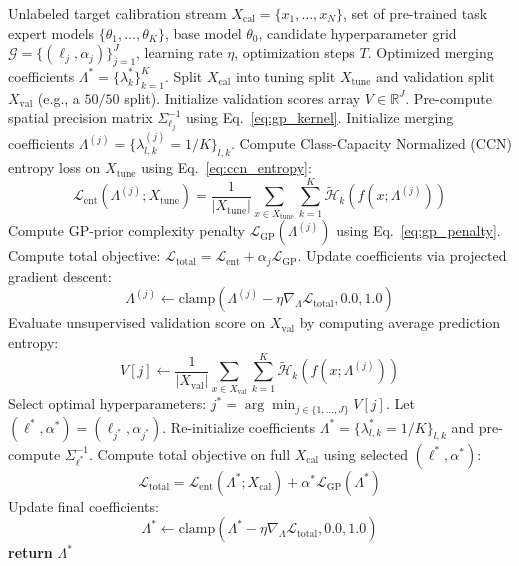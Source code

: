 \documentclass{article}
\theoremstyle{plain}
\theoremstyle{definition}
\theoremstyle{remark}
\begin{document}
\begin{algorithm}[tb]
\caption{Calibration Cross-Validation (CCV) for GP-BayesMerge}
\label{alg:ccv}
\begin{algorithmic}[1]
\REQUIRE Unlabeled target calibration stream $X_{\text{cal}} = \{x_1, \dots, x_N\}$, set of pre-trained task expert models $\{\theta_1, \dots, \theta_K\}$, base model $\theta_0$, candidate hyperparameter grid $\mathcal{G} = \{(\ell_j, \alpha_j)\}_{j=1}^J$, learning rate $\eta$, optimization steps $T$.
\ENSURE Optimized merging coefficients $\Lambda^* = \{\lambda_k^*\}_{k=1}^K$.
\STATE Split $X_{\text{cal}}$ into tuning split $X_{\text{tune}}$ and validation split $X_{\text{val}}$ (e.g., a $50/50$ split).
\STATE Initialize validation scores array $V \in \mathbb{R}^J$.
    \STATE Pre-compute spatial precision matrix $\Sigma_{\ell_j}^{-1}$ using Eq.~\ref{eq:gp_kernel}.
    \STATE Initialize merging coefficients $\Lambda^{(j)} = \{\lambda_{l, k}^{(j)} = 1/K\}_{l, k}$.
        \STATE Compute Class-Capacity Normalized (CCN) entropy loss on $X_{\text{tune}}$ using Eq.~\ref{eq:ccn_entropy}:
        $$\mathcal{L}_{\text{ent}}(\Lambda^{(j)}; X_{\text{tune}}) = \frac{1}{|X_{\text{tune}}|} \sum_{x \in X_{\text{tune}}} \sum_{k=1}^K \tilde{\mathcal{H}}_k(f(x; \Lambda^{(j)}))$$
        \STATE Compute GP-prior complexity penalty $\mathcal{L}_{\text{GP}}(\Lambda^{(j)})$ using Eq.~\ref{eq:gp_penalty}.
        \STATE Compute total objective: $\mathcal{L}_{\text{total}} = \mathcal{L}_{\text{ent}} + \alpha_j \mathcal{L}_{\text{GP}}$.
        \STATE Update coefficients via projected gradient descent:
        $$\Lambda^{(j)} \leftarrow \text{clamp}\left( \Lambda^{(j)} - \eta \nabla_{\Lambda} \mathcal{L}_{\text{total}}, 0.0, 1.0 \right)$$
    \ENDFOR
    \STATE Evaluate unsupervised validation score on $X_{\text{val}}$ by computing average prediction entropy:
    $$V[j] \leftarrow \frac{1}{|X_{\text{val}}|} \sum_{x \in X_{\text{val}}} \sum_{k=1}^K \tilde{\mathcal{H}}_k(f(x; \Lambda^{(j)}))$$
\ENDFOR
\STATE Select optimal hyperparameters: $j^* = \arg\min_{j \in \{1, \dots, J\}} V[j]$.
\STATE Let $(\ell^*, \alpha^*) = (\ell_{j^*}, \alpha_{j^*})$.
\STATE Re-initialize coefficients $\Lambda^* = \{\lambda_{l, k}^* = 1/K\}_{l, k}$ and pre-compute $\Sigma_{\ell^*}^{-1}$.
    \STATE Compute total objective on full $X_{\text{cal}}$ using selected $(\ell^*, \alpha^*)$:
    $$\mathcal{L}_{\text{total}} = \mathcal{L}_{\text{ent}}(\Lambda^*; X_{\text{cal}}) + \alpha^* \mathcal{L}_{\text{GP}}(\Lambda^*)$$
    \STATE Update final coefficients:
    $$\Lambda^* \leftarrow \text{clamp}\left( \Lambda^* - \eta \nabla_{\Lambda} \mathcal{L}_{\text{total}}, 0.0, 1.0 \right)$$
\ENDFOR
\STATE \textbf{return} $\Lambda^*$
\end{algorithmic}
\end{algorithm}
\end{document}
